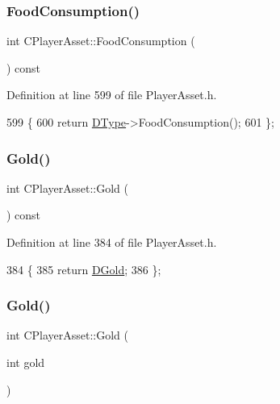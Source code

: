 \subsubsection{\texorpdfstring{Food\+Consumption()}{FoodConsumption()}}
{\footnotesize\ttfamily int C\+Player\+Asset\+::\+Food\+Consumption (\begin{DoxyParamCaption}{ }\end{DoxyParamCaption}) const\hspace{0.3cm}{\ttfamily [inline]}}



Definition at line 599 of file Player\+Asset.\+h.


\begin{DoxyCode}
599                                    \{
600             \textcolor{keywordflow}{return} \hyperlink{classCPlayerAsset_a5d61f73471e1e6f0a6ab15f2ffa7b359}{DType}->FoodConsumption(); 
601         \};
\end{DoxyCode}
\hypertarget{classCPlayerAsset_a03ee2a60c0d332675b4b30573b96d64f}{}\label{classCPlayerAsset_a03ee2a60c0d332675b4b30573b96d64f} 
\subsubsection{\texorpdfstring{Gold()}{Gold()}\hspace{0.1cm}{\footnotesize\ttfamily [1/2]}}
{\footnotesize\ttfamily int C\+Player\+Asset\+::\+Gold (\begin{DoxyParamCaption}{ }\end{DoxyParamCaption}) const\hspace{0.3cm}{\ttfamily [inline]}}



Definition at line 384 of file Player\+Asset.\+h.


\begin{DoxyCode}
384                         \{
385             \textcolor{keywordflow}{return} \hyperlink{classCPlayerAsset_ab90ebdc73c6794fd44ddbe273f610292}{DGold};
386         \};
\end{DoxyCode}
\hypertarget{classCPlayerAsset_a97976cb3f9db851ecaf2a78c268dce32}{}\label{classCPlayerAsset_a97976cb3f9db851ecaf2a78c268dce32} 
\subsubsection{\texorpdfstring{Gold()}{Gold()}\hspace{0.1cm}{\footnotesize\ttfamily [2/2]}}
{\footnotesize\ttfamily int C\+Player\+Asset\+::\+Gold (\begin{DoxyParamCaption}\item[{int}]{gold }\end{DoxyParamCaption})\hspace{0.3cm}{\ttfamily [inline]}}



